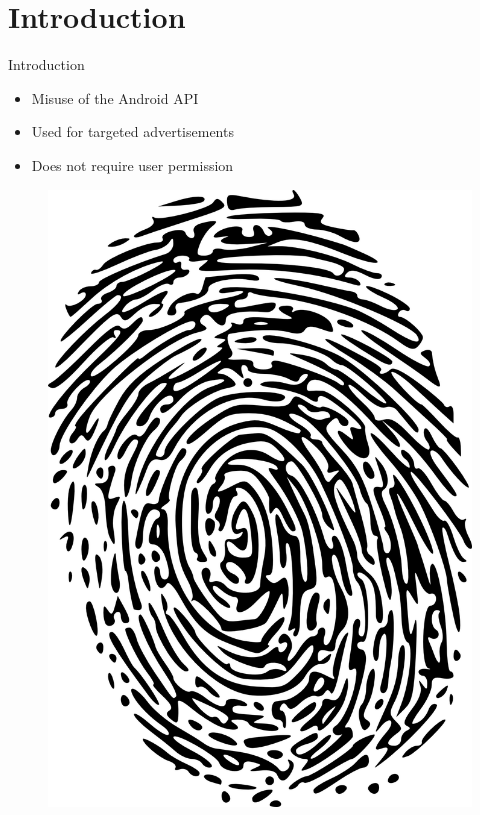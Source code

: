 \documentclass[aspectratio=169]{beamer}
\begin{document}
\section{Introduction}

\begin{frame}{Introduction}
  \begin{minipage}{0.49\textwidth} 
    \begin{itemize}
      \item Misuse of the Android API
      \pause
      \item Used for targeted advertisements
      \pause
      \item Does not require user permission
    \end{itemize}
  \end{minipage}
  \hfill
  \begin{minipage}{0.49\textwidth} 
    \begin{figure}
      \centering
      \includegraphics[height=0.5\textheight]{figures/fingerprint.png}
    \end{figure}
  \end{minipage}


\end{frame}
\end{document}
